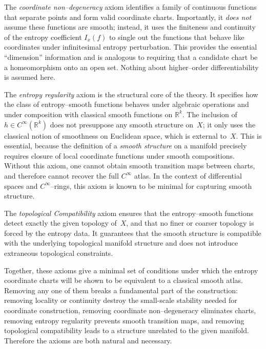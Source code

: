 \documentclass[11pt]{amsart}
\theoremstyle{definition}
\theoremstyle{remark}
\begin{document}
The \emph{coordinate non--degeneracy} axiom identifies a family of continuous functions that separate
points and form valid coordinate charts.  Importantly, it \emph{does not}
assume these functions are smooth; instead, it uses the finiteness and
continuity of the entropy coefficient $I_x(f)$ to single out the functions
that behave like coordinates under infinitesimal entropy perturbation.
This provides the essential ``dimension'' information and is analogous to
requiring that a candidate chart be a homeomorphism onto an open set.
Nothing about higher--order differentiability is assumed here.

The \emph{entropy regularity} axiom is the structural core of the theory. It specifies how the class of
entropy--smooth functions behaves under algebraic operations and under
composition with classical smooth functions on $\mathbb{R}^k$.  The
inclusion of $h\in C^\infty(\mathbb{R}^k)$ does not presuppose any smooth
structure on~$X$; it only uses the classical notion of smoothness on
Euclidean space, which is external to~$X$.  This is essential, because the
definition of a \emph{smooth structure} on a manifold precisely requires
closure of local coordinate functions under smooth compositions.
Without this axiom, one cannot obtain smooth transition maps between
charts, and therefore cannot recover the full $C^\infty$ atlas.  In the
context of differential spaces and $C^\infty$--rings, this axiom is known
to be minimal for capturing smooth structure.

The \emph{topological Compatibility} axiom ensures that the entropy--smooth functions detect exactly the
given topology of~$X$, and that no finer or coarser topology is forced by
the entropy data.  It guarantees that the smooth structure is compatible
with the underlying topological manifold structure and does not introduce
extraneous topological constraints.


Together, these axioms give a minimal set of conditions under which the
entropy coordinate charts will be shown to be equivalent to a classical smooth atlas.  Removing any one
of them breaks a fundamental part of the construction: removing locality
or continuity destroy the small-scale stability needed for coordinate construction,
removing coordinate non--degeneracy eliminates charts, removing entropy
regularity prevents smooth transition maps, and removing topological
compatibility leads to a structure unrelated to the given manifold.
Therefore the axioms are both natural and necessary.

\medskip
\end{document}
